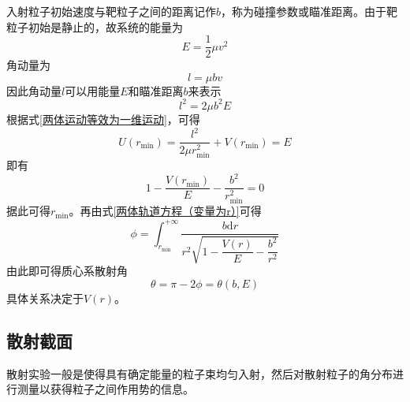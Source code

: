 入射粒子初始速度与靶粒子之间的距离记作$b$，称为{\heiti 碰撞参数}或{\heiti 瞄准距离}。由于靶粒子初始是静止的，故系统的能量为
\begin{equation*}
	E = \frac12 \mu v^2
\end{equation*}
角动量为
\begin{equation*}
	l = \mu b v
\end{equation*}
因此角动量$l$可以用能量$E$和瞄准距离$b$来表示
\begin{equation*}
	l^2 = 2\mu b^2 E
\end{equation*}
根据式\eqref{两体运动等效为一维运动}，可得
\begin{equation*}
	U(r_{\mathrm{min}}) = \frac{l^2}{2\mu r_{\mathrm{min}}^2} + V(r_{\mathrm{min}}) = E
\end{equation*}
即有
\begin{equation*}
	1- \frac{V(r_{\mathrm{min}})}{E} - \frac{b^2}{r_{\mathrm{min}}^2} = 0
\end{equation*}
据此可得$r_{\mathrm{min}}$。再由式\eqref{两体轨道方程（变量为r）}可得
\begin{equation}
	\phi = \int_{r_{\mathrm{min}}}^{+\infty} \frac{b\mathrm{d} r}{r^2 \sqrt{1-\dfrac{V(r)}{E} - \dfrac{b^2}{r^2}}}
\end{equation}
由此即可得质心系散射角
\begin{equation}
	\theta = \pi - 2\phi = \theta(b,E)
	\label{质心系散射角的通用关系式}
\end{equation}
具体关系决定于$V(r)$。

\subsection{散射截面}

散射实验一般是使得具有确定能量的粒子束均匀入射，然后对散射粒子的角分布进行测量以获得粒子之间作用势的信息。


